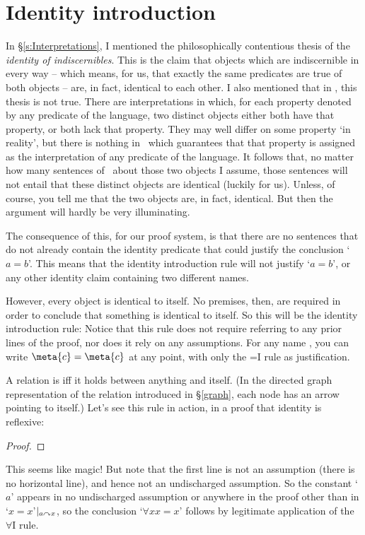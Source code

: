 \section{Identity introduction}\label{idint}
In §\ref{s:Interpretations}, I mentioned the philosophically contentious thesis of the \emph{identity of indiscernibles}. This is the claim that objects which are indiscernible in every way – which means, for us, that exactly the same predicates are true of both objects – are, in fact, identical to each other. I also mentioned that in \FOL, this thesis is not true. There are interpretations in which, for each property denoted by any predicate of the language, two distinct objects either both have that property, or both lack that property. They may well differ on some property `in reality', but there is nothing in \FOL\ which guarantees that that property is assigned as the interpretation of any predicate of the language. 
It follows that, no matter how many sentences of \FOL\ about those two objects I assume, those sentences will not entail that these distinct objects are identical (luckily for us). Unless, of course, you tell me that the two objects are, in fact, identical. But then the argument will hardly be very illuminating.

The consequence of this, for our proof system, is that there are no sentences that do not already contain the identity predicate that could justify the conclusion `$a=b$'. This means that the identity introduction rule will not justify `$a=b$', or any other identity claim containing two different names.

However, every object is identical to itself. No premises, then, are required in order to conclude that something is identical to itself. So this will be the identity introduction rule:
Notice that this rule does not require referring to any prior lines of the proof, nor does it rely on any assumptions. For any name , you can write $\meta{c}=\meta{c}$ at any point, with only the {=}I rule as justification. 

 A relation is  iff it holds between anything and itself. (In the directed graph representation of the relation introduced in §\ref{graph}, each node has an arrow pointing to itself.) Let's see this rule in action, in a proof that identity is reflexive:
\begin{proof}
	\idi{}
\end{proof} This seems like magic! But note that the first line is not an assumption (there is no horizontal line), and hence not an undischarged assumption. So the constant `$a$' appears in no undischarged assumption or anywhere in the proof other than in `$x=x$'$\vert_{a\curvearrowright x}$, so the conclusion `$\forall x x=x$' follows by legitimate application of the $\forall$I rule.


